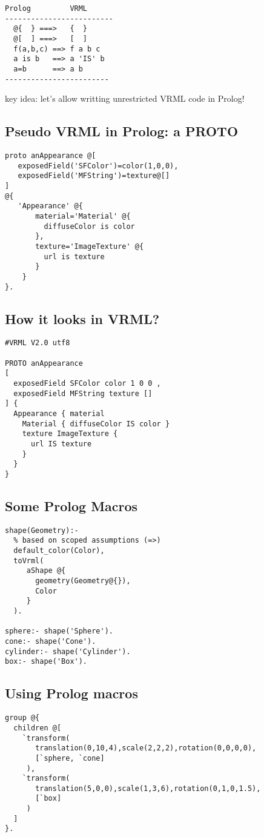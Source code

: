 \documentclass{article}
\begin{document}
\begin{verbatim}
Prolog         VRML
-------------------------
  @{  } ===>   {  }
  @[  ] ===>   [  ]
  f(a,b,c) ==> f a b c
  a is b   ==> a 'IS' b
  a=b      ==> a b
------------------------
\end{verbatim}

\noindent key idea: let's allow writting unrestricted VRML code in Prolog!

\subsection{Pseudo VRML in Prolog: a PROTO}
\begin{verbatim}
proto anAppearance @[
   exposedField('SFColor')=color(1,0,0),
   exposedField('MFString')=texture@[]
] 
@{
   'Appearance' @{
       material='Material' @{
         diffuseColor is color
       },
       texture='ImageTexture' @{
         url is texture
       }
    }
}.
\end{verbatim}

\subsection{How it looks in VRML?}
\begin{verbatim}
#VRML V2.0 utf8 
 
PROTO anAppearance 
[ 
  exposedField SFColor color 1 0 0 , 
  exposedField MFString texture [] 
] { 
  Appearance { material 
    Material { diffuseColor IS color } 
    texture ImageTexture { 
      url IS texture 
    } 
  } 
} 
\end{verbatim}

\subsection{Some Prolog Macros}
\begin{verbatim}
shape(Geometry):-
  % based on scoped assumptions (=>) 
  default_color(Color),
  toVrml(
     aShape @{
       geometry(Geometry@{}),
       Color
     }
  ).

sphere:- shape('Sphere').
cone:- shape('Cone').
cylinder:- shape('Cylinder').
box:- shape('Box').
\end{verbatim}

\subsection{Using Prolog macros}
\begin{verbatim}
group @{
  children @[
    `transform(
       translation(0,10,4),scale(2,2,2),rotation(0,0,0,0),
       [`sphere, `cone]
     ),
    `transform(
       translation(5,0,0),scale(1,3,6),rotation(0,1,0,1.5),
       [`box]
     )
  ]
}.
\end{verbatim}
\end{document}
